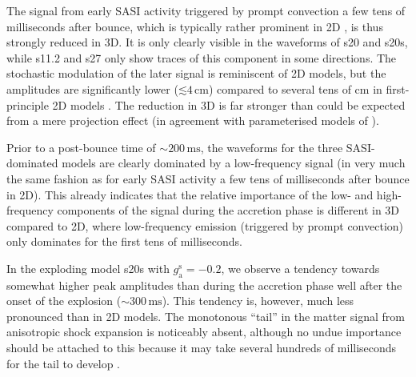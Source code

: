 The signal from early SASI activity triggered by prompt convection a
few tens of milliseconds after bounce, which is typically rather
prominent in 2D
\citep{marek_08,murphy_08,yakunin_10,mueller_13,yakunin_15},
is thus strongly reduced in 3D. It is only clearly visible in
the waveforms of s20 and s20s, while s11.2 and s27 only show traces
of this component in some directions. 
The stochastic modulation of the later signal is reminiscent
of 2D models, but the amplitudes are significantly lower ($\mathord{\lesssim} 4
\, \mathrm{cm}$) compared to several tens of $\mathrm{cm}$ in first-principle 2D
models \citep{marek_08,yakunin_10,mueller_13,yakunin_15}. The
reduction in 3D is far stronger than could be expected from a mere
projection effect (in agreement with parameterised models of
\citealt{mueller_e_12}).

Prior to a post-bounce time of $\mathord{\sim} 200 \, \mathrm{ms}$,
the waveforms for the three SASI-dominated models
are clearly dominated by a low-frequency signal
(in very much the same fashion as for early SASI activity
a few tens of milliseconds after bounce in 2D). This already indicates
that the relative importance of the low- and high-frequency
components of the signal during the accretion phase is different
in 3D compared to 2D,  where low-frequency
emission (triggered by prompt convection) only dominates for the first tens
of milliseconds. 

In the exploding model s20s with $g_\mathrm{a}^\mathrm{s}=-0.2$, we
observe a tendency towards somewhat higher peak amplitudes than during
the accretion phase well after the onset of the explosion
($\mathord{\sim} 300 \, \mathrm{ms}$). This tendency is, however, much
less pronounced than in 2D models. The monotonous ``tail'' in the
matter signal from anisotropic shock expansion
\citep{murphy_09,yakunin_10} is noticeably absent, although no undue
importance should be attached to this because it may take several
hundreds of milliseconds for the tail to develop \citep{mueller_13}.

